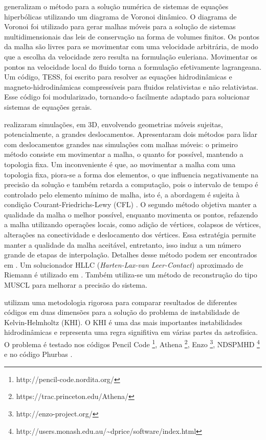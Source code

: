  generalizam o método para a solução numérica de sistemas de equações hiperbólicas utilizando um diagrama de Voronoi dinâmico. O diagrama de Voronoi foi utilizado para gerar malhas móveis para a solução de sistemas multidimensionais das leis de conservação na forma de volumes finitos. Os pontos da malha são livres para se movimentar com uma velocidade arbitrária, de modo que a escolha da velocidade zero resulta na formulação euleriana. Movimentar os pontos na velocidade local do fluido torna a formulação efetivamente lagrangeana. Um código, TESS, foi escrito para resolver as equações hidrodinâmicas e magneto-hidrodinâmicas compressíveis para fluidos relativistas e não relativistas. Esse código foi modularizado, tornando-o facilmente adaptado para solucionar sistemas de equações gerais.

 realizaram simulações, em 3D, envolvendo geometrias móveis sujeitas, potencialmente, a grandes deslocamentos. Apresentaram dois métodos para lidar com deslocamentos grandes nas simulações com malhas móveis: o primeiro método consiste em movimentar a malha, o quanto for possível, mantendo a topologia fixa. Um inconveniente é que, ao movimentar a malha com uma topologia fixa, piora-se a forma dos elementos, o que influencia negativamente na precisão da solução e também retarda a computação, pois o intervalo de tempo é controlado pelo elemento mínimo de malha, isto é, a abordagem é sujeita à condição Courant-Friedrichs-Lewy (CFL) \cite{Courant1928}. O segundo método objetiva manter a qualidade da malha o melhor possível, enquanto movimenta os pontos, refazendo a malha utilizando 
operações locais, como adição de vértices, colapsos de vértices, alterações na conectividade e deslocamento dos vértices. Essa estratégia permite manter a qualidade da malha aceitável, entretanto, isso induz a um número grande de etapas de interpolação. Detalhes desse método podem ser encontrados em . Um solucionador HLLC ({\it Harten-Lax-van Leer-Contact}) \cite{Toro1994} aproximado de Riemann é utilizado em . Também utiliza-se um método de reconstrução do tipo MUSCL para melhorar a precisão do sistema. 

 utilizam uma metodologia rigorosa para comparar resultados de diferentes códigos em duas dimensões para a solução do problema de instabilidade de Kelvin-Helmholtz (KHI). O KHI é uma das mais importantes instabilidades hidrodinâmicas e representa uma regra signifitiva em várias partes da astrofísica. O problema é testado nos códigos Pencil Code \footnote{http://pencil-code.nordita.org/}, Athena \footnote{https://trac.princeton.edu/Athena/}, Enzo \footnote{http://enzo-project.org/}, NDSPMHD \footnote{http://users.monash.edu.au/\~{ }dprice/software/index.html} e no código Phurbas \cite{Maron2012}.

